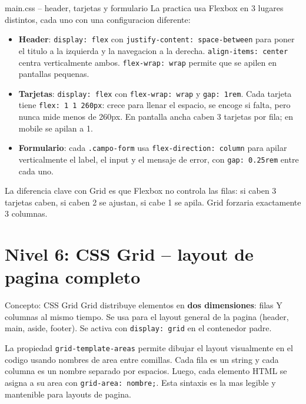 \documentclass[11pt,a4paper]{article}
\begin{document}
	\begin{cajapractica}{main.css -- header, tarjetas y formulario}
		La practica usa Flexbox en 3 lugares distintos, cada uno con una configuracion diferente:
		
		\begin{itemize}[leftmargin=1.2em,itemsep=3pt]
			\item \textbf{Header}: \texttt{display: flex} con \texttt{justify-content: space-between} para poner el titulo a la izquierda y la navegacion a la derecha. \texttt{align-items: center} centra verticalmente ambos. \texttt{flex-wrap: wrap} permite que se apilen en pantallas pequenas.
			\item \textbf{Tarjetas}: \texttt{display: flex} con \texttt{flex-wrap: wrap} y \texttt{gap: 1rem}. Cada tarjeta tiene \texttt{flex: 1 1 260px}: crece para llenar el espacio, se encoge si falta, pero nunca mide menos de 260px. En pantalla ancha caben 3 tarjetas por fila; en mobile se apilan a 1.
			\item \textbf{Formulario}: cada \texttt{.campo-form} usa \texttt{flex-direction: column} para apilar verticalmente el label, el input y el mensaje de error, con \texttt{gap: 0.25rem} entre cada uno.
		\end{itemize}
		
		La diferencia clave con Grid es que Flexbox no controla las filas: si caben 3 tarjetas caben, si caben 2 se ajustan, si cabe 1 se apila. Grid forzaria exactamente 3 columnas.
	\end{cajapractica}
	
	\section{Nivel 6: CSS Grid -- layout de pagina completo}
	
	\begin{cajaconcepto}{Concepto: CSS Grid}
		Grid distribuye elementos en \textbf{dos dimensiones}: filas Y columnas al mismo tiempo. Se usa para el layout general de la pagina (header, main, aside, footer). Se activa con \texttt{display: grid} en el contenedor padre.
		
		La propiedad \texttt{grid-template-areas} permite dibujar el layout visualmente en el codigo usando nombres de area entre comillas. Cada fila es un string y cada columna es un nombre separado por espacios. Luego, cada elemento HTML se asigna a su area con \texttt{grid-area: nombre;}. Esta sintaxis es la mas legible y mantenible para layouts de pagina.
	\end{cajaconcepto}
	
\end{document}
